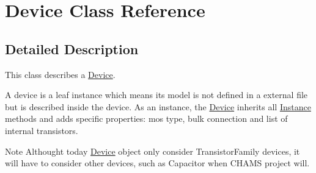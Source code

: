 \hypertarget{class_device}{}\section{Device Class Reference}
\label{class_device}


\subsection{Detailed Description}
This class describes a \mbox{\hyperlink{class_device}{Device}}.

A device is a leaf instance which means its model is not defined in a external file but is described inside the device. As an instance, the \mbox{\hyperlink{class_device}{Device}} inherits all \mbox{\hyperlink{class_instance}{Instance}} methods and adds specific properties\+: mos type, bulk connection and list of internal transistors.

\begin{DoxyNote}{Note}
Althought today \mbox{\hyperlink{class_device}{Device}} object only consider Transistor\+Family devices, it will have to consider other devices, such as Capacitor when C\+H\+A\+MS project will. 
\end{DoxyNote}
